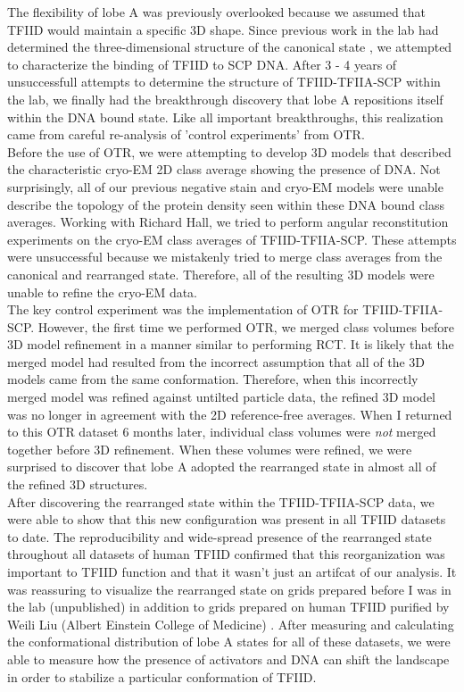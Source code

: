 \indent The flexibility of lobe A was previously overlooked because we assumed that TFIID would maintain a specific 3D shape. Since previous work in the lab had determined the three-dimensional structure of the canonical state \cite{Grob_1281,Liu_723,Liu_574}, we attempted to characterize the binding of TFIID to SCP DNA. After 3 - 4 years of unsuccessfull attempts to determine the structure of TFIID-TFIIA-SCP within the lab, we finally had the breakthrough discovery that lobe A repositions itself within the DNA bound state. Like all important breakthroughs, this realization came from careful re-analysis of 'control experiments' from OTR. \\
\indent Before the use of OTR, we were attempting to develop 3D models that described the characteristic cryo-EM 2D class average showing the presence of DNA. Not surprisingly, all of our previous negative stain and cryo-EM models were unable describe the topology of the protein density seen within these DNA bound class averages. Working with Richard Hall, we tried to perform angular reconstitution experiments on the cryo-EM class averages of TFIID-TFIIA-SCP. These attempts were unsuccessful because we mistakenly tried to merge class averages from the canonical and rearranged state. Therefore, all of the resulting 3D models were unable to refine the cryo-EM data. \\
\indent The key control experiment was the implementation of OTR for TFIID-TFIIA-SCP. However, the first time we performed OTR, we merged class volumes before 3D model refinement in a manner similar to performing RCT. It is likely that the merged model had resulted from the incorrect assumption that all of the 3D models came from the same conformation. Therefore, when this incorrectly merged model was refined against untilted particle data, the refined 3D model was no longer in agreement with the 2D reference-free averages. When I returned to this OTR dataset 6 months later, individual class volumes were \emph{not} merged together before 3D refinement. When these volumes were refined, we were surprised to discover that lobe A adopted the rearranged state in almost all of the refined 3D structures. \\
\indent After discovering the rearranged state within the TFIID-TFIIA-SCP data, we were able to show that this new configuration was present in all TFIID datasets to date. The reproducibility and wide-spread presence of the rearranged state throughout all datasets of human TFIID confirmed that this reorganization was important to TFIID function and that it wasn't just an artifcat of our analysis. It was reassuring to visualize the rearranged state on grids prepared before I was in the lab (unpublished) in addition to grids prepared on human TFIID purified by Weili Liu (Albert Einstein College of Medicine) \cite{Liu_723,Liu_574}. After measuring and calculating the conformational distribution of lobe A states for all of these datasets, we were able to measure how the presence of activators and DNA can shift the landscape in order to stabilize a particular conformation of TFIID.\\

